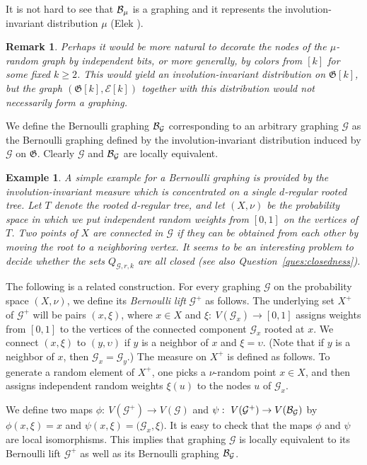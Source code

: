 \documentclass{article}
\newtheorem{remark}[theorem]{Remark}
\newtheorem{example}[theorem]{Example}
\def\GG{\mathcal{G}}\def\HH{\mathcal{H}}\def\II{\mathcal{I}}
\def\Gf{\mathfrak{G}}\def\Hf{\mathfrak{H}}\def\If{\mathfrak{I}}
\begin{document}
It is not hard to see that $\mathcal{B}_\mu$ is a graphing and it represents
the involution-invariant distribution $\mu$ (Elek \cite{Elek}).

\begin{remark}\label{BERN}
Perhaps it would be more natural to decorate the nodes of the
$\mu$-random graph by independent bits, or more generally, by colors
from $[k]$ for some fixed $k\ge2$. This would yield an
involution-invariant distribution on $\Gf[k]$, but the graph
$(\Gf[k],\mathcal{E}[k])$ together with this distribution would not necessarily
form a graphing.
\end{remark}

We define the Bernoulli graphing $\BB_\GG$ corresponding to an
arbitrary graphing $\GG$ as the Bernoulli graphing defined by the
involution-invariant distribution induced by $\GG$ on $\Gf$. Clearly $\GG$ and
$\BB_\GG$ are locally equivalent.

\begin{example}
A simple example for a Bernoulli graphing is provided by the
involution-invariant measure which is concentrated on a single
$d$-regular rooted tree. Let $T$ denote the rooted $d$-regular tree,
and let $(X,\nu)$ be the probability space in which we put
independent random {weights} from $[0,1]$ on the vertices of $T$. Two
points of $X$ are connected in $\GG$ if they can be obtained from
each other by moving the root to a neighboring vertex. It seems to be
an interesting problem to decide whether the sets $Q_{\GG,r,k}$ are
all closed (see also Question~\ref{ques:closedness}).
\end{example}

The following is a related construction. For every graphing $\GG$ on
the probability space $(X,\nu)$, we define its \emph{Bernoulli lift}
$\GG^+$ as follows. The underlying set $X^+$ of $\GG^+$ will be pairs
$(x,\xi)$, where $x\in X$ and $\xi:~V(\GG_x)\to[0,1]$ assigns weights
from $[0,1]$ to the vertices of the connected component $\GG_x$
rooted at $x$. We connect $(x,\xi)$ to $(y,\upsilon)$ if $y$ is a
neighbor of $x$ and $\xi=\upsilon$. (Note that if $y$ is a neighbor
of $x$, then $\GG_x=\GG_y$.) The measure on $X^+$ is defined as
follows. To generate a random element of $X^+$, one picks a
$\nu$-random point $x\in X$, and then assigns independent random
weights $\xi(u)$ to the nodes $u$ of $\GG_x$.

We define two maps $\phi:~V(\GG^+)\to V(\GG)$ and $\psi:~V(\GG^+)\to
V(\BB_\GG)$ by $\phi(x,\xi)=x$ and $\psi(x,\xi)=
\bigl(\GG_x,\xi\bigr)$. It is easy to check that the maps $\phi$ and
$\psi$ are local isomorphisms. This implies that graphing $\GG$ is
locally equivalent to its Bernoulli lift $\GG^+$ as well as its
Bernoulli graphing $\BB_\GG$.
\end{document}

